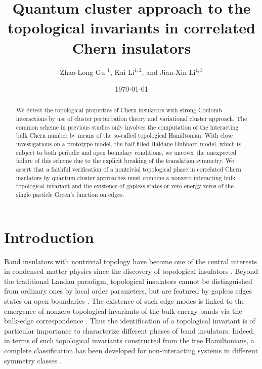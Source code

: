 \documentclass[12pt]{iopart}
\begin{document}
\title[Topological invariants in correlated Chern insulators]{Quantum cluster approach to the topological invariants in correlated Chern insulators}

\author{Zhao-Long Gu $^1$, Kai Li$^{1,2}$, and Jian-Xin Li$^{1,3}$}
\address{$^1$ National Laboratory of Solid State Microstructures and Department of Physics, Nanjing University, Nanjing 210093, China}
\address{$^2$ School of Physics and Engineering, Zhengzhou University, Zhengzhou 450001, China}
\address{$^3$ Collaborative Innovation Center of Advanced Microstructures, Nanjing University, Nanjing 210093, China}
\date{\today}

\begin{abstract}
\par We detect the topological properties of Chern insulators with strong Coulomb interactions by use of cluster perturbation theory and variational cluster approach. The common scheme in previous studies only involves the computation of the interacting bulk Chern number by means of the so-called topological Hamiltonian. With close investigations on a prototype model, the half-filled Haldane Hubbard model, which is subject to both periodic and open boundary conditions, we uncover the unexpected failure of this scheme due to the explicit breaking of the translation symmetry. We assert that a faithful verification of a nontrivial topological phase in correlated Chern insulators by quantum cluster approaches must combine a nonzero interacting bulk topological invariant and the existence of gapless states or zero-energy zeros of the single particle Green's function on edges.

\end{abstract}

\submitto{\NJP}
\maketitle

\section{Introduction}

\par Band insulators with nontrivial topology have become one of the central interests in condensed matter physics since the discovery of topological insulators \cite{HK_RMP2010,QZ_RMP2011}. Beyond the traditional Landau paradigm, topological insulators cannot be distinguished from ordinary ones by local order parameters, but are featured by gapless edges states on open boundaries \cite{H_PRL1988,K_PU2001,KM_PRL2005,BHZ_S2006,LYGJ_PRB2016,LGLW_NJP2017}. The existence of such edge modes is linked to the emergence of nonzero topological invariants of the bulk energy bands via the bulk-edge correspondence \cite{QWZ_PRB2006}. Thus the identification of a topological invariant is of particular importance to characterize different phases of band insulators. Indeed, in terms of such topological invariants constructed from the free Hamiltonians, a complete classification has been developed for non-interacting systems in different symmetry classes \cite{SRFL_PRB2008}.
\end{document}
